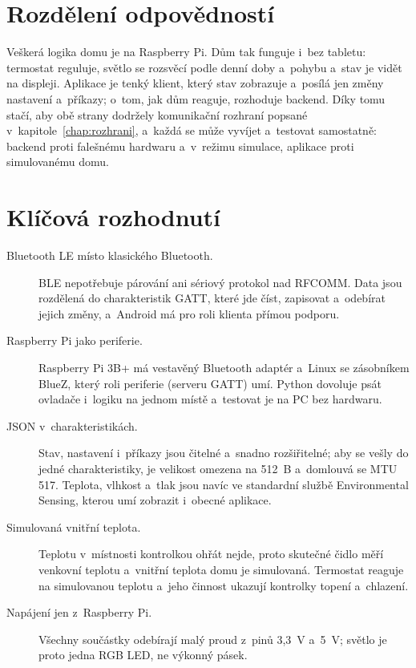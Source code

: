 \section{Rozdělení odpovědností}

Veškerá logika domu je na Raspberry Pi. Dům tak funguje i~bez tabletu: termostat reguluje,
světlo se rozsvěcí podle denní doby a~pohybu a~stav je vidět na displeji. Aplikace je tenký
klient, který stav zobrazuje a~posílá jen změny nastavení a~příkazy; o~tom, jak dům reaguje,
rozhoduje backend. Díky tomu stačí, aby obě strany dodržely komunikační rozhraní popsané
v~kapitole~\ref{chap:rozhrani}, a~každá se může vyvíjet a~testovat samostatně: backend proti
falešnému hardwaru a~v~režimu simulace, aplikace proti simulovanému domu.

\section{Klíčová rozhodnutí}

\begin{description}
  \item[Bluetooth LE místo klasického Bluetooth.] BLE nepotřebuje párování ani sériový
        protokol nad RFCOMM. Data jsou rozdělená do charakteristik GATT, které jde číst, zapisovat
        a~odebírat jejich změny, a~Android má pro roli klienta přímou podporu.
  \item[Raspberry Pi jako periferie.] Raspberry Pi 3B+ má vestavěný Bluetooth adaptér a~Linux
        se zásobníkem BlueZ, který roli periferie (serveru GATT) umí. Python dovoluje psát
        ovladače i~logiku na jednom místě a~testovat je na PC bez hardwaru.
  \item[JSON v~charakteristikách.] Stav, nastavení i~příkazy jsou čitelné a~snadno
        rozšiřitelné; aby se vešly do jedné charakteristiky, je velikost omezena na 512~B
        a~domlouvá se MTU 517. Teplota, vlhkost a~tlak jsou navíc ve standardní službě
        Environmental Sensing, kterou umí zobrazit i~obecné aplikace.
  \item[Simulovaná vnitřní teplota.] Teplotu v~místnosti kontrolkou ohřát nejde, proto
        skutečné čidlo měří venkovní teplotu a~vnitřní teplota domu je simulovaná. Termostat
        reaguje na simulovanou teplotu a~jeho činnost ukazují kontrolky topení a~chlazení.
  \item[Napájení jen z~Raspberry Pi.] Všechny součástky odebírají malý proud z~pinů 3,3~V
        a~5~V; světlo je proto jedna RGB LED, ne výkonný pásek.
\end{description}

